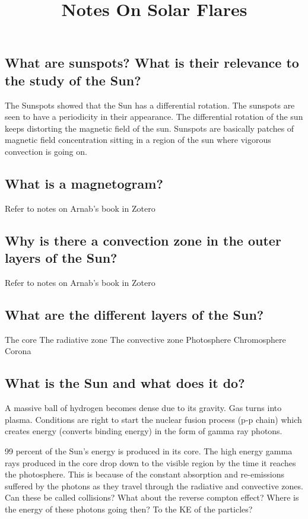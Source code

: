 \documentclass{../template/texnote}
\title{Notes On Solar Flares}
\begin{document}
    \maketitle {}
	\subsection{What are sunspots? What is their relevance to the study of the Sun?}

The Sunspots showed that the Sun has a differential rotation.
The sunspots are seen to have a periodicity in their appearance.
The differential rotation of the sun keeps distorting the magnetic field of the sun.
Sunspots are basically patches of magnetic field concentration sitting in a region of the sun where vigorous convection is going on.

\subsection{What is a magnetogram?}

Refer to notes on Arnab’s book in Zotero



\subsection{Why is there a convection zone in the outer layers of the Sun?}

Refer to notes on Arnab’s book in Zotero

\subsection{What are the different layers of the Sun?}

The core
The radiative zone
The convective zone
Photosphere
Chromosphere
Corona

\subsection{What is the Sun and what does it do?}

A massive ball of hydrogen becomes dense due to its gravity. Gas turns into plasma. Conditions are right to start the nuclear fusion process (p-p chain) which creates energy (converts binding energy) in the form of gamma ray photons. 

99 percent of the Sun’s energy is produced in its core. The high energy gamma rays produced in the core drop down to the visible region by the time it reaches the photosphere. This is because of the constant absorption and re-emissions suffered by the photons as they travel through the radiative and convective zones. Can these be called collisions? What about the reverse compton effect? Where is the energy of these photons going then? To the KE of the particles?
\end{document}
